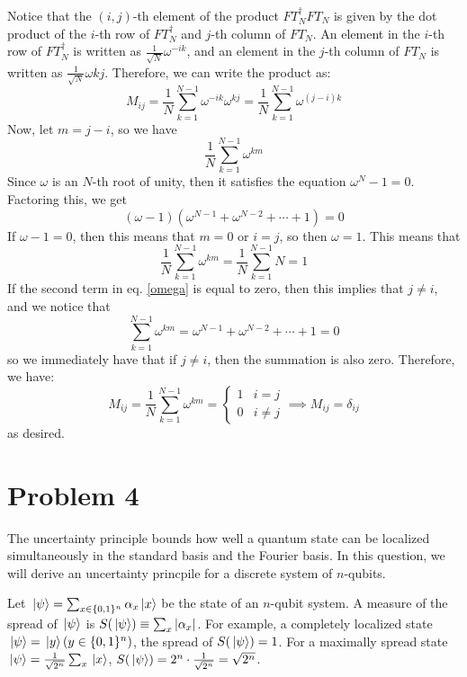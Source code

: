 \documentclass[10pt]{article}
\begin{document}
	\begin{solution}
		Notice that the \( (i, j) \)-th element of the product \( FT_N^{\dagger}FT_N \) is given by 
		the dot product of the \( i \)-th row of \( FT_N^{\dagger} \) and \( j \)-th column of 
		\( FT_N \). An element in the \( i \)-th row of \( FT_N^{\dagger} \) is written as 
		\( \frac{1}{\sqrt{N} }\omega^{-ik} \), and an element in the \( j \)-th column of \( FT_N \) is 
		written as \( \frac{1}{\sqrt{N} }\omega kj \). 
		Therefore, we can write the product as: 
		\[
			M_{ij} = \frac{1}{N}\sum_{k=1}^{N - 1} \omega^{-ik} \omega^{kj} = \frac{1}{N} \sum_{k=1}^{N-1} 
			\omega^{(j - i) k}
		\] 
		Now, let \( m = j - i \), so we have 
		\[
		\frac{1}{N}\sum_{k=1}^{N-1} \omega^{km}
		\] 
		Since \( \omega \) is an \( N \)-th root of unity, then it satisfies the equation \( \omega^{N} - 1 = 0\).
		Factoring this, we get
		\begin{equation}
			\label{omega}
			(\omega - 1)(\omega^{N - 1} + \omega^{N-2} + \cdots + 1) = 0
		\end{equation} 
		If \( \omega - 1 = 0 \), then this means that \( m = 0\) or \( i = j \),
		so then \( \omega = 1 \). This means that 
		\[
		\frac{1}{N} \sum_{k=1}^{N-1} \omega^{km} = \frac{1}{N}\sum_{k=1}^{N-1} N = 1
		\] 
		If the second term in eq. \ref{omega} is equal to zero, then this implies that \( j \neq i \), and 
		we notice that 
		\[ \sum_{k=1}^{N-1} \omega^{km} = \omega^{N - 1} + \omega^{N-2} + \cdots + 1 = 0\]
		so 
		we immediately have that if \( j \neq i \), then the summation is also zero. Therefore, we have:
		\[
		M_{ij} = \frac{1}{N}\sum_{k=1}^{N-1} \omega^{km} = \begin{cases}
			1 & i = j\\
			0 & i \neq j 
		\end{cases} \implies M_{ij} = \delta_{ij}
		\] 
		as desired. 
	\end{solution}
	\pagebreak
	\section*{Problem 4}
	The uncertainty principle bounds how well a quantum state can be localized simultaneously in the standard 
	basis and the Fourier basis. In this question, we will derive an uncertainty princpile for a discrete system 
	of \( n \)-qubits. 

	Let \( \ket*{\psi} = \sum_{x \in \{0, 1\} ^{n}}\alpha_x\ket*{x} \) be the state of an \( n\)-qubit system. 
	A measure of the spread of \( \ket*{\psi} \) is \( S(\ket*{\psi}) \equiv \sum_x |\alpha_x| \). For example, 
	a completely localized state \( \ket*{\psi} = \ket*{y} (y \in \{0, 1\} ^{n}) \), the spread of 
	\( S(\ket*{\psi}) = 1 \). For a maximally spread state \( \ket*{\psi} = \frac{1}{\sqrt{2^{n}} }\sum_x 
	\ket*{x}\), \( S(\ket*{\psi}) = 2^{n} \cdot \frac{1}{\sqrt{2^{n}} } = \sqrt{2^{n}}  \). 
\end{document}
